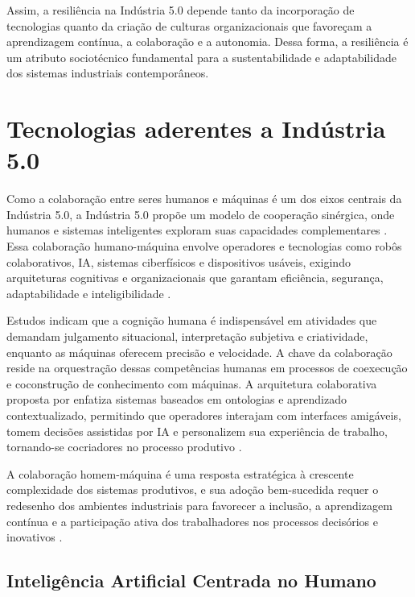 Assim, a resiliência na Indústria 5.0 depende tanto da incorporação de tecnologias quanto da criação de culturas organizacionais que favoreçam a aprendizagem contínua, a colaboração e a autonomia.
Dessa forma, a resiliência é um atributo sociotécnico fundamental para a sustentabilidade e adaptabilidade dos sistemas industriais contemporâneos.

\section{Tecnologias aderentes a Indústria 5.0}


Como a colaboração entre seres humanos e máquinas é um dos eixos centrais da Indústria 5.0,  a Indústria 5.0 propõe um modelo de cooperação sinérgica, onde humanos e sistemas inteligentes exploram suas capacidades complementares \cite{Nahavandi2019, Santana_2023}.
Essa colaboração humano-máquina envolve operadores e tecnologias como robôs colaborativos, \gls{IA}, sistemas ciberfísicos e dispositivos usáveis, exigindo arquiteturas cognitivas e organizacionais que garantam eficiência, segurança, adaptabilidade e inteligibilidade \cite{TOTH2023, PIZON2023}.

Estudos indicam que a cognição humana é indispensável em atividades que demandam julgamento situacional, interpretação subjetiva e criatividade, enquanto as máquinas oferecem precisão e velocidade.
A chave da colaboração reside na orquestração dessas competências humanas em processos de coexecução e coconstrução de conhecimento \cite{TOTH2023} com máquinas.
A arquitetura colaborativa proposta por  enfatiza sistemas baseados em ontologias e aprendizado contextualizado, permitindo que operadores interajam com interfaces amigáveis, tomem decisões assistidas por \gls{IA} e personalizem sua experiência de trabalho, tornando-se cocriadores no processo produtivo \cite{TOTH2023, YANG2024}.

A colaboração homem-máquina é uma resposta estratégica à crescente complexidade dos sistemas produtivos, e sua adoção bem-sucedida requer o redesenho dos ambientes industriais para favorecer a inclusão, a aprendizagem contínua e a participação ativa dos trabalhadores nos processos decisórios e inovativos \cite{silva2024}.

\subsection{Inteligência Artificial Centrada no Humano}

